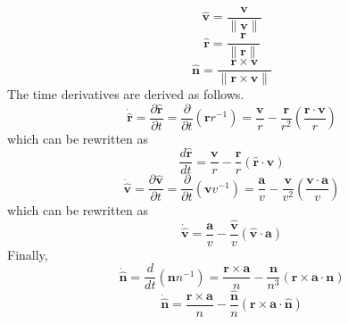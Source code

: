 {\begin{equation}
     \boxed{\hat{\mathbf{v}} = \frac{\mathbf{v}}{\| \mathbf{v}
     \|}}
\end{equation}
%
\begin{equation}
\boxed{\hat{\mathbf{r}} = \frac{\mathbf{r}}{\| \mathbf{r}
     \|}}
\end{equation}
%
\begin{equation}
     \boxed{\hat{\mathbf{n}} = \frac{\mathbf{r}\times \mathbf{v}}{ \| \mathbf{r}\times \mathbf{v}
     \|}}
\end{equation}
%
The time derivatives are derived as follows.
%
\begin{equation}
    \dot{\hat{\mathbf{r}}} =
    \frac{\partial \hat{\mathbf{r}}}{ \partial t} = \frac{\partial }{ \partial
    t}\left( \mathbf{r} r^{-1}  \right) = \frac{\mathbf{v}}{r} -
    \frac{\mathbf{r}}{r^2}\left(\frac{\mathbf{r}\cdot\mathbf{v}}{r}\right)
\end{equation}
%
which can be rewritten as
%
\begin{equation}
    \boxed{\frac{d\hat{\mathbf{r}}}{dt} = \frac{\mathbf{v}}{r}  -
     \frac{\hat{\mathbf{r}}}{r}
     \left(\hat{\mathbf{r}} \cdot
     \mathbf{v} \right)}
\end{equation}
%
\begin{equation}
    \dot{\hat{\mathbf{v}}} =
    \frac{\partial \hat{\mathbf{v}}}{ \partial t} = \frac{\partial }{ \partial
    t}\left( \mathbf{v} v^{-1}  \right) = \frac{\mathbf{a}}{v} -
    \frac{\mathbf{v}}{v^2}\left(\frac{\mathbf{v}\cdot\mathbf{a}}{v}\right)
\end{equation}
%
which can be rewritten as
%
\begin{equation}
    \boxed{\dot{\hat{\mathbf{v}}} = \frac{\mathbf{a}}{v} -
    \frac{\hat{\mathbf{v}}}{v}\left(\hat{\mathbf{v}}\cdot\mathbf{a}\right)}
\end{equation}
%
Finally,
%
\begin{equation}
     \dot{\hat{\mathbf{n}}} = \frac{d}{dt}\left( \mathbf{n} n^{-1}
     \right)= \frac{\mathbf{r} \times \mathbf{a}}{n} - \frac{\mathbf{n}}{n^3} \left(  \mathbf{r}\times\mathbf{a} \cdot \mathbf{n} \right)
     \label{Eq:VBN_Ndot}
\end{equation}
%
\begin{equation}
     \boxed{\dot{\hat{\mathbf{n}}} = \frac{\mathbf{r} \times \mathbf{a}}{n} - \frac{\hat{\mathbf{n}}}{n} \left(  \mathbf{r}\times\mathbf{a} \cdot \hat{\mathbf{n}} \right)
     }\label{Eq:VBN_Ndot}
\end{equation}


}
